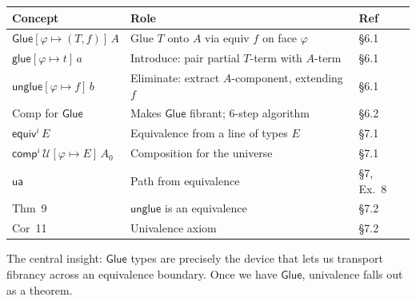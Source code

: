 \documentclass[11pt, a4paper]{article}
\newcommand{\UU}{\mathcal{U}}
\newcommand{\pt}[1]{\mathsf{#1}}
\newcommand{\GlueT}{\pt{Glue}}
\newcommand{\glueT}{\pt{glue}}
\newcommand{\unglueT}{\pt{unglue}}
\newcommand{\compT}{\pt{comp}}
\newcommand{\eqop}[1]{\pt{equiv}^{#1}}
\newcommand{\sys}[2]{[#1 \mapsto #2]}
\begin{document}
\begin{center}
\renewcommand{\arraystretch}{1.3}
\begin{tabular}{@{}lll@{}}
\hline
\textbf{Concept} & \textbf{Role} & \textbf{Ref} \\
\hline
$\GlueT\sys{\varphi}{(T,f)}\,A$ & Glue $T$ onto $A$ via equiv $f$ on face $\varphi$ & §6.1 \\
$\glueT\sys{\varphi}{t}\,a$ & Introduce: pair partial $T$-term with $A$-term & §6.1 \\
$\unglueT\sys{\varphi}{f}\,b$ & Eliminate: extract $A$-component, extending $f$ & §6.1 \\
Comp for $\GlueT$ & Makes $\GlueT$ fibrant; 6-step algorithm & §6.2 \\
$\eqop{i}\,E$ & Equivalence from a line of types $E$ & §7.1 \\
$\compT^i\,\UU\sys{\varphi}{E}\,A_0$ & Composition for the universe & §7.1 \\
$\pt{ua}$ & Path from equivalence & §7, Ex.~8 \\
Thm~9 & $\unglueT$ is an equivalence & §7.2 \\
Cor~11 & Univalence axiom & §7.2 \\
\hline
\end{tabular}
\end{center}

\bigskip\noindent
The central insight: $\GlueT$ types are precisely the device that lets us
transport fibrancy across an equivalence boundary. Once we have $\GlueT$,
univalence falls out as a theorem.
\end{document}
